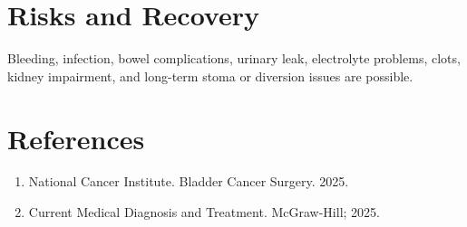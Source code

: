 \section*{Risks and Recovery}
Bleeding, infection, bowel complications, urinary leak, electrolyte problems, clots, kidney impairment, and long-term stoma or diversion issues are possible.
\section*{References}
\begin{enumerate}\item National Cancer Institute. Bladder Cancer Surgery. 2025.\item Current Medical Diagnosis and Treatment. McGraw-Hill; 2025.\end{enumerate}
\clearpage
